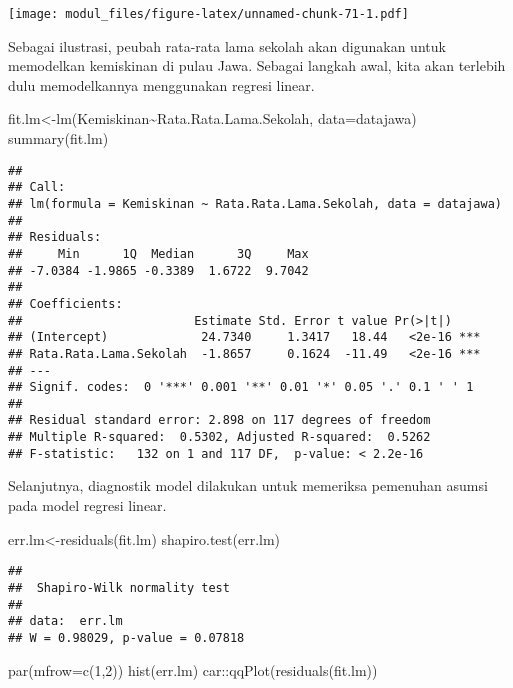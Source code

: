 \documentclass[
]{book}
\newenvironment{Shaded}{\begin{snugshade}}{\end{snugshade}}
\newcommand{\AttributeTok}[1]{\textcolor[rgb]{0.77,0.63,0.00}{#1}}
\newcommand{\DecValTok}[1]{\textcolor[rgb]{0.00,0.00,0.81}{#1}}
\newcommand{\FunctionTok}[1]{\textcolor[rgb]{0.00,0.00,0.00}{#1}}
\newcommand{\NormalTok}[1]{#1}
\newcommand{\OtherTok}[1]{\textcolor[rgb]{0.56,0.35,0.01}{#1}}
\newcommand{\SpecialCharTok}[1]{\textcolor[rgb]{0.00,0.00,0.00}{#1}}
\begin{document}
\texttt{[image: modul\_files/figure-latex/unnamed-chunk-71-1.pdf]}

Sebagai ilustrasi, peubah rata-rata lama sekolah akan digunakan untuk memodelkan kemiskinan di pulau Jawa. Sebagai langkah awal, kita akan terlebih dulu memodelkannya menggunakan regresi linear.

\begin{Shaded}
\begin{Highlighting}[]
\NormalTok{fit.lm}\OtherTok{\textless{}{-}}\FunctionTok{lm}\NormalTok{(Kemiskinan}\SpecialCharTok{\textasciitilde{}}\NormalTok{Rata.Rata.Lama.Sekolah, }\AttributeTok{data=}\NormalTok{datajawa)}
\FunctionTok{summary}\NormalTok{(fit.lm)}
\end{Highlighting}
\end{Shaded}

\begin{verbatim}
## 
## Call:
## lm(formula = Kemiskinan ~ Rata.Rata.Lama.Sekolah, data = datajawa)
## 
## Residuals:
##     Min      1Q  Median      3Q     Max 
## -7.0384 -1.9865 -0.3389  1.6722  9.7042 
## 
## Coefficients:
##                        Estimate Std. Error t value Pr(>|t|)    
## (Intercept)             24.7340     1.3417   18.44   <2e-16 ***
## Rata.Rata.Lama.Sekolah  -1.8657     0.1624  -11.49   <2e-16 ***
## ---
## Signif. codes:  0 '***' 0.001 '**' 0.01 '*' 0.05 '.' 0.1 ' ' 1
## 
## Residual standard error: 2.898 on 117 degrees of freedom
## Multiple R-squared:  0.5302, Adjusted R-squared:  0.5262 
## F-statistic:   132 on 1 and 117 DF,  p-value: < 2.2e-16
\end{verbatim}

Selanjutnya, diagnostik model dilakukan untuk memeriksa pemenuhan asumsi pada model regresi linear.

\begin{Shaded}
\begin{Highlighting}[]
\NormalTok{err.lm}\OtherTok{\textless{}{-}}\FunctionTok{residuals}\NormalTok{(fit.lm)}
\FunctionTok{shapiro.test}\NormalTok{(err.lm)}
\end{Highlighting}
\end{Shaded}

\begin{verbatim}
## 
##  Shapiro-Wilk normality test
## 
## data:  err.lm
## W = 0.98029, p-value = 0.07818
\end{verbatim}

\begin{Shaded}
\begin{Highlighting}[]
\FunctionTok{par}\NormalTok{(}\AttributeTok{mfrow=}\FunctionTok{c}\NormalTok{(}\DecValTok{1}\NormalTok{,}\DecValTok{2}\NormalTok{))}
\FunctionTok{hist}\NormalTok{(err.lm)}
\NormalTok{car}\SpecialCharTok{::}\FunctionTok{qqPlot}\NormalTok{(}\FunctionTok{residuals}\NormalTok{(fit.lm))}
\end{Highlighting}
\end{Shaded}
\end{document}

